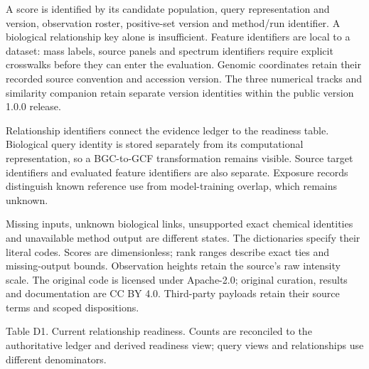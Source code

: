 \documentclass[
  10pt,
  a4paper,
]{article}
\begin{document}
A score is identified by its candidate population, query representation and version, observation roster, positive-set version and method/run identifier. A biological relationship key alone is insufficient. Feature identifiers are local to a dataset: mass labels, source panels and spectrum identifiers require explicit crosswalks before they can enter the evaluation. Genomic coordinates retain their recorded source convention and accession version. The three numerical tracks and similarity companion retain separate version identities within the public version 1.0.0 release.

Relationship identifiers connect the evidence ledger to the readiness table. Biological query identity is stored separately from its computational representation, so a BGC-to-GCF transformation remains visible. Source target identifiers and evaluated feature identifiers are also separate. Exposure records distinguish known reference use from model-training overlap, which remains unknown.

Missing inputs, unknown biological links, unsupported exact chemical identities and unavailable method output are different states. The dictionaries specify their literal codes. Scores are dimensionless; rank ranges describe exact ties and missing-output bounds. Observation heights retain the source's raw intensity scale. The original code is licensed under Apache-2.0; original curation, results and documentation are CC BY 4.0. Third-party payloads retain their source terms and scoped dispositions.

\Needspace{175pt} Table D1. Current relationship readiness. Counts are reconciled to the authoritative ledger and derived readiness view; query views and relationships use different denominators.
\end{document}
